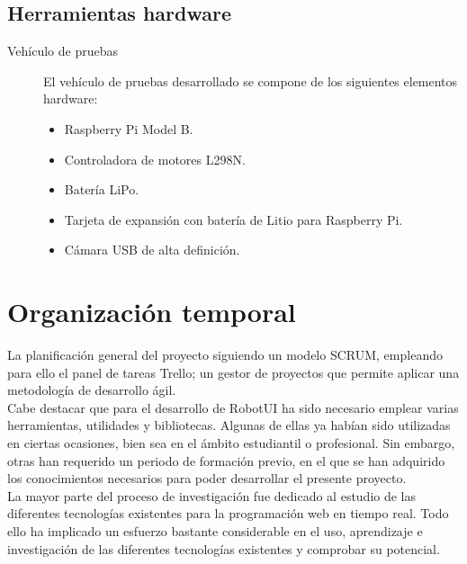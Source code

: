 \documentclass[a4paper,12pt]{article}
\begin{document}
\subsection{Herramientas hardware}

\begin{description}
\item [Vehículo de pruebas ]

El vehículo de pruebas desarrollado se compone de los siguientes elementos hardware:\\

\begin{itemize}
\item Raspberry Pi Model B.
\item Controladora de motores L298N.
\item Batería LiPo.
\item Tarjeta de expansión con batería de Litio para Raspberry Pi.
\item Cámara USB de alta definición.
\end{itemize}

\end{description}


\section{Organización temporal}

La planificación general del proyecto siguiendo un modelo SCRUM, empleando para ello el panel de tareas Trello; un gestor de proyectos que permite aplicar una metodología de desarrollo ágil.\\

Cabe destacar que para el desarrollo de RobotUI ha sido necesario emplear varias herramientas, utilidades y bibliotecas. Algunas de ellas ya habían sido utilizadas en ciertas ocasiones, bien sea en el ámbito estudiantil o profesional. 
Sin embargo, otras han requerido un periodo de formación previo, en el que se han adquirido los conocimientos necesarios para poder desarrollar el presente proyecto.\\

La mayor parte del proceso de investigación fue dedicado al estudio de las diferentes tecnologías existentes para la programación web en tiempo real. Todo ello ha implicado un esfuerzo bastante considerable en el uso, 
aprendizaje e investigación de las diferentes tecnologías existentes y comprobar su potencial.\\
\end{document}
